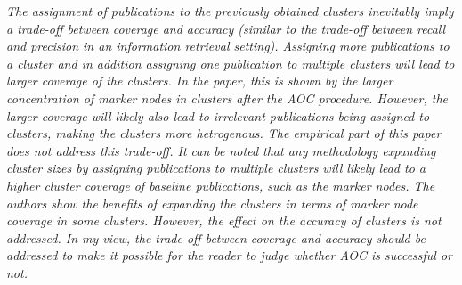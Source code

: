 \documentclass[11pt, oneside]{article}   	%
\begin{document}
 \vspace{2 mm}  
 \emph{The assignment of publications to the previously obtained clusters inevitably imply a trade-off between coverage and accuracy (similar to the trade-off between recall and precision in an information retrieval setting). Assigning more publications to a cluster and in addition assigning one publication to multiple clusters will lead to larger coverage of the clusters. In the paper, this is shown by the larger concentration of marker nodes in clusters after the AOC procedure. However, the larger coverage will likely also lead to irrelevant publications being assigned to clusters, making the clusters more hetrogenous. The empirical part of this paper does not address this trade-off. It can be noted that any methodology expanding cluster sizes by assigning publications to multiple clusters will likely lead to a higher cluster coverage of baseline publications, such as the marker nodes. The authors show the benefits of expanding the clusters in terms of marker node coverage in some clusters. However, the effect on the accuracy of clusters is not addressed. In my view, the trade-off between coverage and accuracy should be addressed to make it possible for the reader to judge whether AOC is successful or not.}
\end{document}
